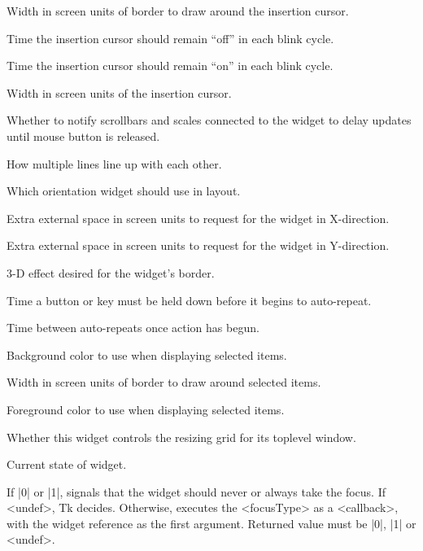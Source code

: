 \begin{enum}{1cm}
Width in screen units of border to draw around the insertion cursor.

Time the insertion cursor should remain ``off'' in each blink cycle.

Time the insertion cursor should remain ``on'' in each blink cycle.

Width in screen units of the insertion cursor.

Whether to notify scrollbars and scales connected
to the widget to delay updates until mouse button is released.

How multiple lines line up with each other.

Which orientation widget should use in layout.

Extra external space in screen units to request for the widget in X-direction.

Extra external space in screen units to request for the widget in Y-direction.

3-D  effect desired for the widget's border.

Time a button or key must be held down before it begins to
auto-repeat.

Time between auto-repeats once action has begun.

Background color to use when displaying selected items.

Width in screen units of border to draw around selected items.

Foreground color to use when displaying selected items.

Whether this widget controls the resizing grid for its 
toplevel  window.

Current state of widget.

If |0| or |1|, signals that the widget should never or always take the focus.
If <undef>, Tk decides. Otherwise, executes the <focusType> as a <callback>, with the widget
reference as the first argument. Returned value must be |0|, |1| or <undef>.


\end{enum}
